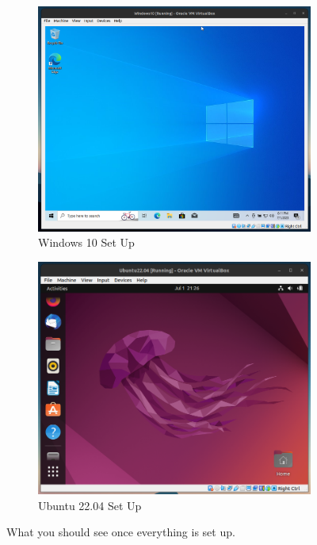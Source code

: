   \begin{figure}[hbt!]
      \centering 
      \begin{subfigure}[b]{0.45\textwidth}
      \centering
          \includegraphics[width=\textwidth]{img/VM_Windows3.png}
          \caption{Windows 10 Set Up}
          \label{fig:VM_Windows3}
      \end{subfigure}
      \hfill 
      \begin{subfigure}[b]{0.45\textwidth}
      \centering
          \includegraphics[width=\textwidth]{img/VM_Ubuntu3.png}
          \caption{Ubuntu 22.04 Set Up}
          \label{fig:VM_Ubuntu3}
      \end{subfigure}
      \caption{What you should see once everything is set up. }
  \end{figure}

